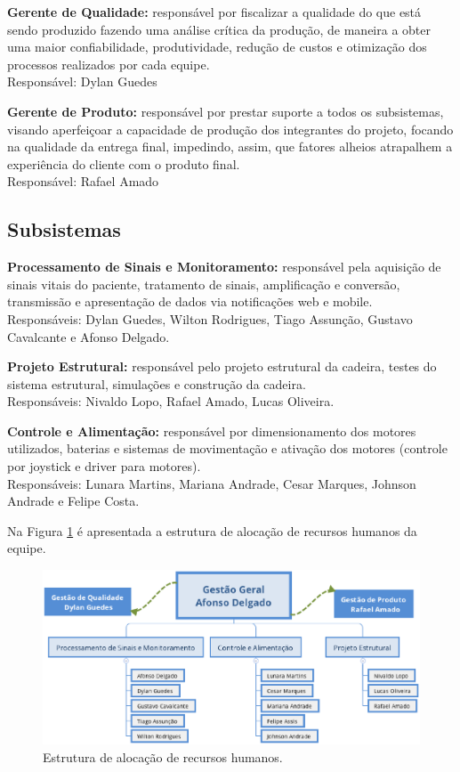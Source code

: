 \textbf{Gerente de Qualidade:} responsável por fiscalizar a qualidade do que está sendo produzido fazendo uma análise crítica da produção, de maneira a obter uma maior confiabilidade, produtividade, redução de custos e otimização dos processos realizados por cada equipe.
\\Responsável: Dylan Guedes

\textbf{Gerente de Produto:} responsável por prestar suporte a todos os subsistemas, visando aperfeiçoar a capacidade de produção dos integrantes do projeto, focando na qualidade da entrega final, impedindo, assim,  que fatores alheios atrapalhem a experiência do cliente com o produto final.
\\Responsável: Rafael Amado

\subsection{Subsistemas}

\textbf{Processamento de Sinais e Monitoramento:} responsável pela aquisição de sinais vitais do paciente,
tratamento de sinais, amplificação e conversão, transmissão e apresentação de
dados via notificações web e mobile.
\\Responsáveis: Dylan Guedes, Wilton Rodrigues, Tiago Assunção, Gustavo Cavalcante e Afonso Delgado.

\textbf{Projeto Estrutural:} responsável pelo projeto estrutural da cadeira, testes
do sistema estrutural, simulações e construção da cadeira.
\\Responsáveis: Nivaldo Lopo, Rafael Amado, Lucas Oliveira.

\textbf{Controle e Alimentação:} responsável por dimensionamento dos motores utilizados,
baterias e sistemas de movimentação e ativação dos motores (controle por
joystick e driver para motores).
\\Responsáveis: Lunara Martins, Mariana Andrade, Cesar Marques, Johnson Andrade e Felipe Costa.

Na Figura \ref{fig:flux_rh} é apresentada a estrutura de alocação de recursos humanos da equipe.


\begin{figure}[h]
    \centering
    \includegraphics[keepaspectratio=true,width=\textwidth]{figuras/rh-umiss.eps}
    \caption{Estrutura de alocação de recursos humanos.}
    \label{fig:flux_rh}
\end{figure}


